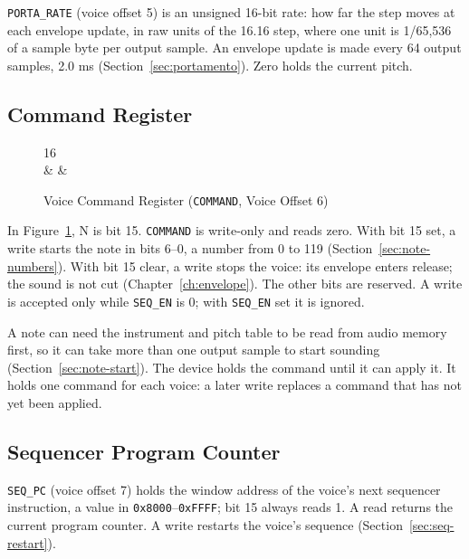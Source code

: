 \texttt{PORTA\_RATE} (voice offset 5) is an unsigned 16-bit rate: how far the step moves at each envelope update, in raw units of the 16.16 step, where one unit is 1/65,536 of a sample byte per output sample. An envelope update is made every 64 output samples, 2.0 ms (Section~\ref{sec:portamento}). Zero holds the current pitch.

\subsection{Command Register}
\label{sec:reg-command}

\begin{figure}[H]
	\centering
	\begin{bytefield}[bitwidth=2em]{16}
		 \\
		 &
		 &
	\end{bytefield}
	\caption{Voice Command Register (\texttt{COMMAND}, Voice Offset 6)}
	\label{fig:reg-command}
\end{figure}

In Figure~\ref{fig:reg-command}, N is bit 15. \texttt{COMMAND} is write-only and reads zero. With bit 15 set, a write
starts the note in bits 6--0, a number from 0 to 119 (Section~\ref{sec:note-numbers}). With bit 15 clear, a write stops
the voice: its envelope enters release; the sound is not cut (Chapter~\ref{ch:envelope}). The other bits are reserved.
A write is accepted only while \texttt{SEQ\_EN} is 0; with \texttt{SEQ\_EN} set it is ignored.

A note can need the instrument and pitch table to be read from audio memory first, so it can take more than one output
sample to start sounding (Section~\ref{sec:note-start}). The device holds the command until it can apply it. It holds
one command for each voice: a later write replaces a command that has not yet been applied.

\subsection{Sequencer Program Counter}

\texttt{SEQ\_PC} (voice offset 7) holds the window address of the voice's next sequencer instruction, a value in
\texttt{0x8000}--\texttt{0xFFFF}; bit 15 always reads 1. A read returns the current program counter. A write restarts
the voice's sequence (Section~\ref{sec:seq-restart}).
